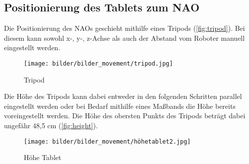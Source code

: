 \subsection{Positionierung des Tablets zum NAO}
Die Positionierung des NAOs geschieht mithilfe eines Tripods (\vref{fig:tripod}). Bei diesem kann sowohl x-, y-, z-Achse als auch der Abstand vom Roboter manuell eingestellt werden.

\begin{figure}[H]
\centering
    \texttt{[image: bilder/bilder\_movement/tripod.jpg]}
        \caption{Tripod}
        \label{fig:tripod}
\end{figure}

Die Höhe des Tripods kann dabei entweder in den folgenden Schritten parallel eingestellt werden oder bei Bedarf mithilfe eines Maßbands die Höhe bereits voreingestellt werden. Die Höhe des obersten Punkts des Tripods beträgt dabei ungefähr 48,5 cm (\vref{fig:height}). 
\begin{figure}[H]
\centering
    \texttt{[image: bilder/bilder\_movement/höhetablet2.jpg]}
        \caption{Höhe Tablet}
            \label{fig:height}
\end{figure}

